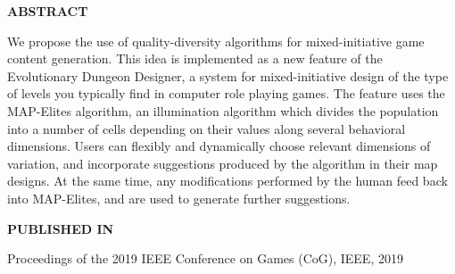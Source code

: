 \graphicspath{{included-papers-tex/paper-3/pap3-figures/}}





\normalfont
\textbf{\textsc{ABSTRACT}}

We propose the use of quality-diversity algorithms for mixed-initiative game content generation. This idea is implemented as a new feature of the Evolutionary Dungeon Designer, a system for mixed-initiative design of the type of levels you typically find in computer role playing games. The feature uses the MAP-Elites algorithm, an illumination algorithm which divides the population into a number of cells depending on their values along several behavioral dimensions. Users can flexibly and dynamically choose relevant dimensions of variation, and incorporate suggestions produced by the algorithm in their map designs. At the same time, any modifications performed by the human feed back into MAP-Elites, and are used to generate further suggestions.

\textbf{\textsc{PUBLISHED IN}}

Proceedings of the 2019 IEEE Conference on Games (CoG), IEEE, 2019

